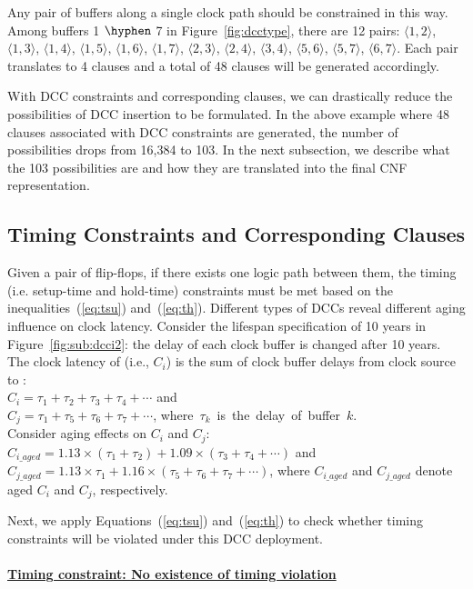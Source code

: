 Any pair of buffers along a single clock path should be constrained in this way. Among buffers 1 $\hyphen$ 7 in Figure~\ref{fig:dcctype}, there are 12 pairs: $\langle1, 2\rangle$, $\langle1, 3\rangle$, $\langle1, 4\rangle$, $\langle1, 5\rangle$, $\langle1, 6\rangle$, $\langle1, 7\rangle$, $\langle2, 3\rangle$, $\langle2, 4\rangle$, $\langle3, 4\rangle$, $\langle5, 6\rangle$, $\langle5, 7\rangle$, $\langle6, 7\rangle$. Each pair translates to 4 clauses and a total of 48 clauses will be generated accordingly.

With DCC constraints and corresponding clauses, we can drastically reduce the possibilities of DCC insertion to be formulated. In the above example where 48 clauses associated with DCC constraints are generated, the number of possibilities drops from 16,384 to 103. In the next subsection, we describe what the 103 possibilities are and how they are translated into the final CNF representation.

\subsection{Timing Constraints and Corresponding Clauses}
\label{subsec:tccc}
Given a pair of flip-flops, if there exists one logic path between them, the timing (i.e. setup-time and hold-time) constraints must be met based on the inequalities~(\ref{eq:tsu}) and~(\ref{eq:th}). Different types of DCCs reveal different aging influence on clock latency. Consider the lifespan specification of 10 years in Figure~\ref{fig:sub:dcci2}: the delay of each clock buffer is changed after 10 years. The clock latency of  (i.e., $C_i$) is the sum of clock buffer delays from clock source to : \\
$C_i = \tau_1 + \tau_2 + \tau_3 + \tau_4 +\dotsb$ and \\
$C_j = \tau_1 + \tau_5 + \tau_6 + \tau_7 +\dotsb$, \mbox{\fontsize{9}{10.8}\selectfont where $\tau_k$ is the delay of buffer $k$.}\\
Consider aging effects on $C_i$ and $C_j$: \\
$C_{i\_aged} = 1.13 \times \left(\tau_1 + \tau_2\right) + 1.09 \times \left(\tau_3 + \tau_4 + \dotsb\right)$ and \\
$C_{j\_aged} = 1.13 \times \tau_1+ 1.16 \times \left( \tau_5 + \tau_6 + \tau_7 + \dotsb \right)$, where $C_{i\_aged}$ and $C_{j\_aged}$ denote aged $C_i$ and $C_j$, respectively.

Next, we apply Equations~(\ref{eq:tsu}) and~(\ref{eq:th}) to check whether timing constraints will be violated under this DCC deployment.\\ \\
\textbf{\uline{Timing constraint: No existence of timing violation}}

